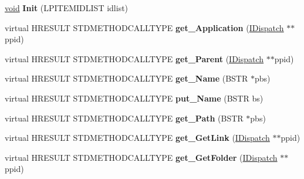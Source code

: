 \begin{DoxyCompactItemize}
\item 
\mbox{\label{class_c_folder_item_a4276d6a0bc4179648a7f1468a0905bca}} 
\hyperlink{interfacevoid}{void} {\bfseries Init} (L\+P\+I\+T\+E\+M\+I\+D\+L\+I\+ST idlist)
\item 
\mbox{\label{class_c_folder_item_aff01150bc1d852db7ae178970fae06c6}} 
virtual H\+R\+E\+S\+U\+LT S\+T\+D\+M\+E\+T\+H\+O\+D\+C\+A\+L\+L\+T\+Y\+PE {\bfseries get\+\_\+\+Application} (\hyperlink{interface_i_dispatch}{I\+Dispatch} $\ast$$\ast$ppid)
\item 
\mbox{\label{class_c_folder_item_a9450f5e073bd31f9ac5bff300fa042fd}} 
virtual H\+R\+E\+S\+U\+LT S\+T\+D\+M\+E\+T\+H\+O\+D\+C\+A\+L\+L\+T\+Y\+PE {\bfseries get\+\_\+\+Parent} (\hyperlink{interface_i_dispatch}{I\+Dispatch} $\ast$$\ast$ppid)
\item 
\mbox{\label{class_c_folder_item_ab07235877da31311c79e10f9953d38ce}} 
virtual H\+R\+E\+S\+U\+LT S\+T\+D\+M\+E\+T\+H\+O\+D\+C\+A\+L\+L\+T\+Y\+PE {\bfseries get\+\_\+\+Name} (B\+S\+TR $\ast$pbs)
\item 
\mbox{\label{class_c_folder_item_a9c71cae2b1a00d12428bc330a8163113}} 
virtual H\+R\+E\+S\+U\+LT S\+T\+D\+M\+E\+T\+H\+O\+D\+C\+A\+L\+L\+T\+Y\+PE {\bfseries put\+\_\+\+Name} (B\+S\+TR bs)
\item 
\mbox{\label{class_c_folder_item_a5c0ebcd6fa860fde6d8a73a6f19bb3a7}} 
virtual H\+R\+E\+S\+U\+LT S\+T\+D\+M\+E\+T\+H\+O\+D\+C\+A\+L\+L\+T\+Y\+PE {\bfseries get\+\_\+\+Path} (B\+S\+TR $\ast$pbs)
\item 
\mbox{\label{class_c_folder_item_abdc8c600998500115334c52847db19a9}} 
virtual H\+R\+E\+S\+U\+LT S\+T\+D\+M\+E\+T\+H\+O\+D\+C\+A\+L\+L\+T\+Y\+PE {\bfseries get\+\_\+\+Get\+Link} (\hyperlink{interface_i_dispatch}{I\+Dispatch} $\ast$$\ast$ppid)
\item 
\mbox{\label{class_c_folder_item_ab3a46aae649763cca969f4b891a4c7a4}} 
virtual H\+R\+E\+S\+U\+LT S\+T\+D\+M\+E\+T\+H\+O\+D\+C\+A\+L\+L\+T\+Y\+PE {\bfseries get\+\_\+\+Get\+Folder} (\hyperlink{interface_i_dispatch}{I\+Dispatch} $\ast$$\ast$ppid)

\end{DoxyCompactItemize}
